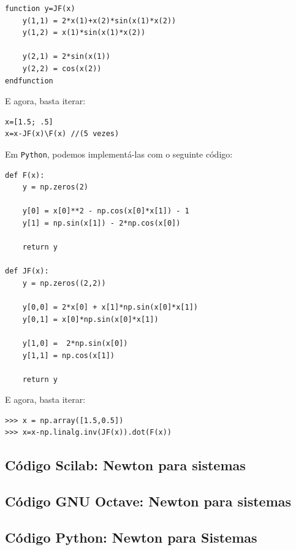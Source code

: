 \begin{sol}
\begin{verbatim}
function y=JF(x)
    y(1,1) = 2*x(1)+x(2)*sin(x(1)*x(2))
    y(1,2) = x(1)*sin(x(1)*x(2))

    y(2,1) = 2*sin(x(1))
    y(2,2) = cos(x(2))
endfunction
\end{verbatim}

E agora, basta iterar:
\begin{verbatim}
x=[1.5; .5]
x=x-JF(x)\F(x) //(5 vezes)
\end{verbatim}
\fi
\ifispython
Em \verb+Python+, podemos implementá-las com o seguinte código:
\begin{verbatim}
def F(x):
    y = np.zeros(2)

    y[0] = x[0]**2 - np.cos(x[0]*x[1]) - 1
    y[1] = np.sin(x[1]) - 2*np.cos(x[0])

    return y

def JF(x):
    y = np.zeros((2,2))

    y[0,0] = 2*x[0] + x[1]*np.sin(x[0]*x[1])
    y[0,1] = x[0]*np.sin(x[0]*x[1])

    y[1,0] =  2*np.sin(x[0])
    y[1,1] = np.cos(x[1])

    return y
\end{verbatim}

E agora, basta iterar:
\begin{verbatim}
>>> x = np.array([1.5,0.5])
>>> x=x-np.linalg.inv(JF(x)).dot(F(x))
\end{verbatim}
\fi
\end{sol}

\ifisscilab
\subsection{Código Scilab: Newton para sistemas}


\fi
\ifisoctave
\subsection{Código GNU Octave: Newton para sistemas}


\fi
\ifispython
\subsection{Código Python: Newton para Sistemas}

